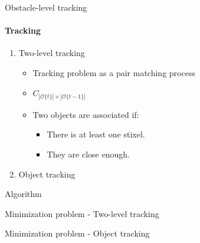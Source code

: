 \begin{frame}{Obstacle-level tracking}
  \framesubtitle{Tracking}
  \begin{enumerate}
   \item<1-> Two-level tracking
   \begin{itemize}
    \item<3-> Tracking problem as a pair matching process
    \item<4-> $C_{|\mathcal{O}\{t\}| \times |\mathcal{O}\{t - 1\}|}$
    \item<5-> Two objects are associated if:
    \begin{itemize}
     \item<5-> There is at least one stixel.
     \item<6-> They are close enough.
    \end{itemize}
   \end{itemize}
   \item<2-> Object tracking
  \end{enumerate}
  \begin{overlayarea}{\textwidth}{\textheight}
   {
    \vskip-2.0cm
    \begin{block}{Algorithm}
    \vskip-0.4cm
    \begin{algorithm}[H]
    \begin{algorithmic}[1]
    \footnotesize
	  \EndIf
	\EndFor
      \EndFor
    \EndFunction
    \end{algorithmic}
    \end{algorithm}
    \end{block}
  }
   {
    \vskip-1.0cm
    \begin{block}{Minimization problem - Two-level tracking}
      \begin{center}
      \end{center}
    \end{block}
  }
   {
    \begin{block}{Minimization problem - Object tracking}
      \begin{center}
      \end{center}
    \end{block}
  }
  \end{overlayarea}


\end{frame}
